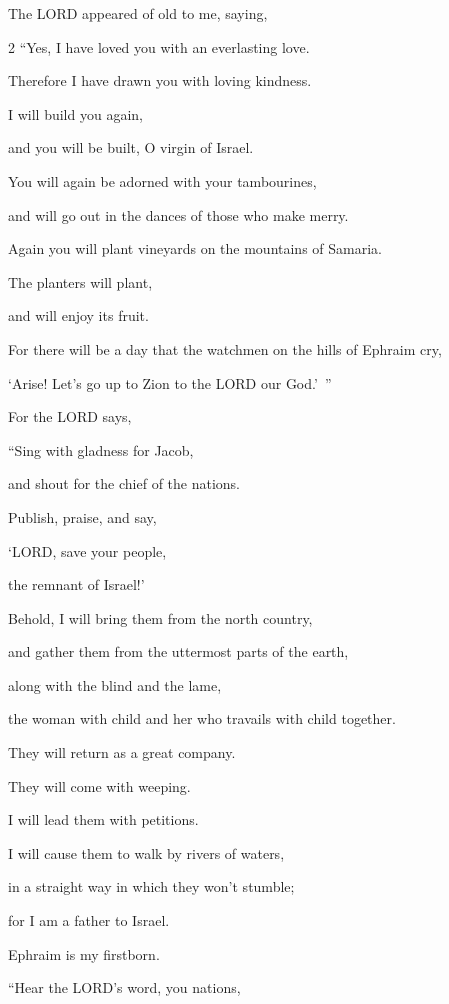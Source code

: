 \myverse{}The LORD appeared of old to me, saying,
\begin{multicols}{2}
“Yes, I have loved you with an everlasting love.
			
Therefore I have drawn you with loving kindness.


\myverse{}I will build you again,

and you will be built, O virgin of Israel.

You will again be adorned with your tambourines,

and will go out in the dances of those who make merry.


\myverse{}Again you will plant vineyards on the mountains of Samaria.

The planters will plant,

and will enjoy its fruit.


\myverse{}For there will be a day that the watchmen on the hills of Ephraim
cry,

‘Arise! Let’s go up to Zion to the LORD our God.’ ”


\myverse{}For the LORD says,

“Sing with gladness for Jacob,

and shout for the chief of the nations.

Publish, praise, and say,

‘LORD, save your people,

the remnant of Israel!’


\myverse{}Behold, I will bring them from the north country,

and gather them from the uttermost parts of the earth,

along with the blind and the lame,

the woman with child and her who travails with child together.

They will return as a great company.


\myverse{}They will come with weeping.

I will lead them with petitions.

I will cause them to walk by rivers of waters,

in a straight way in which they won’t stumble;

for I am a father to Israel.

Ephraim is my firstborn.
			
\vspace{\baselineskip}			

\myverse{}“Hear the LORD’s word, you nations,


\end{multicols}
